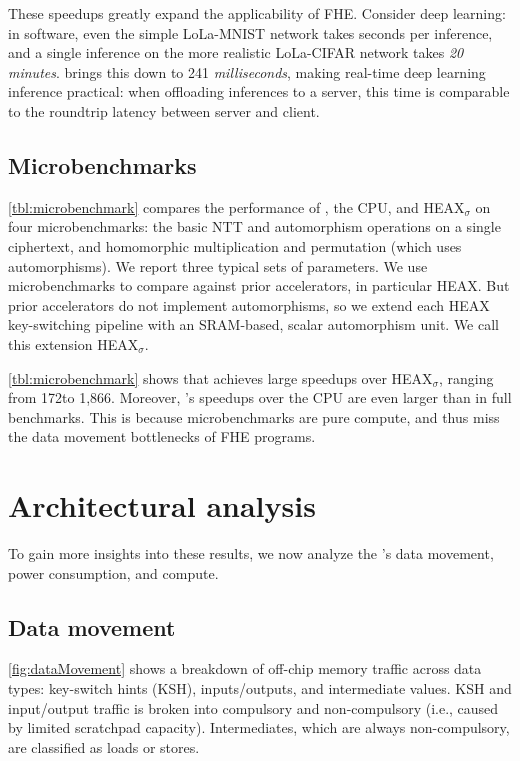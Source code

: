 These speedups greatly expand the applicability of FHE. Consider deep learning:
in software, even the simple LoLa-MNIST network takes seconds per inference,
and a single inference on the more realistic LoLa-CIFAR network takes \emph{20 minutes}.
\name brings this down to 241 \emph{milliseconds},
making real-time deep learning inference practical:
when offloading inferences to a server, this time is comparable
to the roundtrip latency between server and client.



\subsection{Microbenchmarks}
\autoref{tbl:microbenchmark} compares the performance of \name, the CPU, and HEAX$_\sigma$ on four microbenchmarks:
the basic NTT and automorphism operations on a single ciphertext,
and homomorphic multiplication and permutation (which uses automorphisms).
We report three typical sets of parameters.
We use microbenchmarks to compare against prior accelerators,
in particular HEAX.
But prior accelerators do not implement automorphisms,
so we extend each HEAX key-switching pipeline with an SRAM-based, scalar automorphism unit.
We call this extension HEAX$_\sigma$.

\autoref{tbl:microbenchmark} shows that
\name achieves large speedups over HEAX$_\sigma$,
ranging from 172\x to 1,866\x.
Moreover, \name's speedups over the CPU are even larger than in full benchmarks.
This is because microbenchmarks are pure compute,
and thus miss the data movement bottlenecks of FHE programs.

\tblMicrobenchmark

\vspace{-2pt}
\section{Architectural analysis}

To gain more insights into these results, we now analyze the \name's data movement, power consumption, and compute.

\subsection{Data movement} \label{sec:datamovement}
\autoref{fig:dataMovement} shows a breakdown of off-chip memory traffic across data types:
key-switch hints (KSH), inputs/outputs, and intermediate values.
KSH and input/output traffic is broken into compulsory and
non-compulsory (i.e., caused by limited scratchpad capacity).
Intermediates, which are always non-compulsory, are classified as loads or stores.

